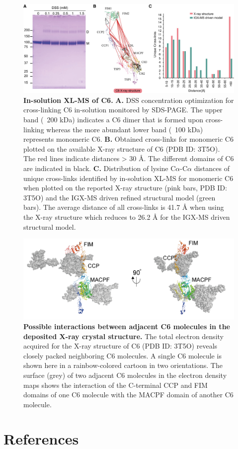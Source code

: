 \begin{subappendices}
    \begin{figure}[hbt!]
        \center
        \includegraphics[width=\textwidth]{Chapter.2/Figures/SI_EV_3.jpg} 
        \caption{\textbf{In-solution XL-MS of C6.} \textbf{A.} DSS concentration optimization for cross-linking C6 in-solution monitored by SDS-PAGE. The upper band (~200 kDa) indicates a C6 dimer that is formed upon cross-linking whereas the more abundant lower band (~100 kDa) represents monomeric C6. \textbf{B.} Obtained cross-links for monomeric C6 plotted on the available X-ray structure of C6 (PDB ID: 3T5O). The red lines indicate distances > 30 Å. The different domains of C6 are indicated in black. \textbf{C.} Distribution of lysine C$\alpha$-C$\alpha$ distances of unique cross-links identified by in-solution XL-MS for monomeric C6 when plotted on the reported X-ray structure (pink bars, PDB ID: 3T5O) and the IGX-MS driven refined structural model (green bars). The average distance of all cross-links is 41.7 Å when using the X-ray structure which reduces to 26.2 Å for the IGX-MS driven structural model.}
        \label{fig:ch2_app_fig9}
    \end{figure}

    \begin{figure}[hbt!]
        \center
        \includegraphics[width=\textwidth]{Chapter.2/Figures/SI_Fig8.png} 
        \caption{\textbf{Possible interactions between adjacent C6 molecules in the deposited X-ray crystal structure.} The total electron density acquired for the X-ray structure of C6 (PDB ID: 3T5O) reveals closely packed neighboring C6 molecules. A single C6 molecule is shown here in a rainbow-colored cartoon in two orientations. The surface (grey) of two adjacent C6 molecules in the electron density maps shows the interaction of the C-terminal CCP and FIM domains of one C6 molecule with the MACPF domain of another C6 molecule.}
        \label{fig:ch2_app_fig10}
    \end{figure}

\end{subappendices}

\clearpage
\section*{References}

